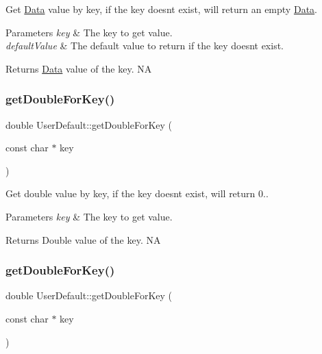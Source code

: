 Get \hyperlink{classData}{Data} value by key, if the key doesn\textquotesingle{}t exist, will return an empty \hyperlink{classData}{Data}. 
\begin{DoxyParams}{Parameters}
{\em key} & The key to get value. \\
\hline
{\em default\+Value} & The default value to return if the key doesn\textquotesingle{}t exist. \\
\hline
\end{DoxyParams}
\begin{DoxyReturn}{Returns}
\hyperlink{classData}{Data} value of the key.  NA 
\end{DoxyReturn}
\mbox{\label{classUserDefault_a5cde9f96889493950057fb4b6ec34464}} 
\subsubsection{\texorpdfstring{get\+Double\+For\+Key()}{getDoubleForKey()}\hspace{0.1cm}{\footnotesize\ttfamily [1/4]}}
{\footnotesize\ttfamily double User\+Default\+::get\+Double\+For\+Key (\begin{DoxyParamCaption}\item[{const char $\ast$}]{key }\end{DoxyParamCaption})}

Get double value by key, if the key doesn\textquotesingle{}t exist, will return 0.. 
\begin{DoxyParams}{Parameters}
{\em key} & The key to get value. \\
\hline
\end{DoxyParams}
\begin{DoxyReturn}{Returns}
Double value of the key.  NA 
\end{DoxyReturn}
\mbox{\label{classUserDefault_a5cde9f96889493950057fb4b6ec34464}} 
\subsubsection{\texorpdfstring{get\+Double\+For\+Key()}{getDoubleForKey()}\hspace{0.1cm}{\footnotesize\ttfamily [2/4]}}
{\footnotesize\ttfamily double User\+Default\+::get\+Double\+For\+Key (\begin{DoxyParamCaption}\item[{const char $\ast$}]{key }\end{DoxyParamCaption})}

